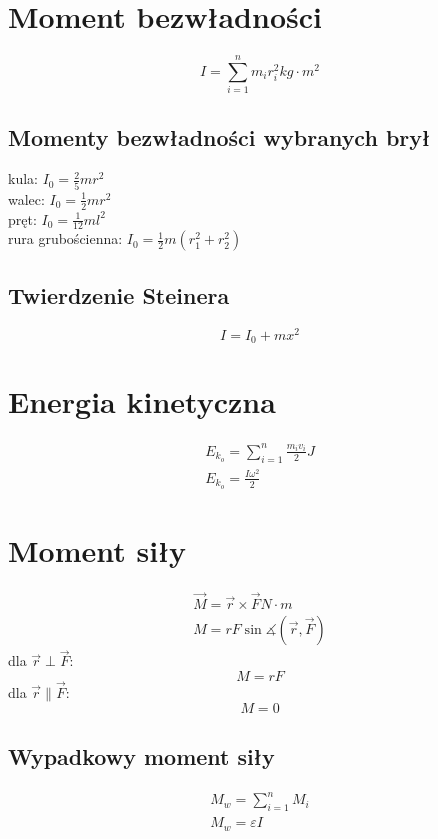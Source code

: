     \section{Moment bezwładności}
      \begin{equation}
        I = \sum_{i=1}^n m_ir_i^2 \unit{kg\cdot m^2}
      \end{equation}
        \subsection{Momenty bezwładności wybranych brył}
        kula: $I_0 = \frac{2}{5}mr^2$\\
        walec: $I_0 = \frac{1}{2}mr^2$\\
        pręt: $I_0 = \frac{1}{12}ml^2$\\
        rura grubościenna: $I_0 = \frac{1}{2}m(r_1^2 + r_2^2)$
      \subsection{Twierdzenie Steinera}
        \begin{equation}
          I = I_0 +mx^2
        \end{equation}
    \section{Energia kinetyczna}
      \begin{gather}
        E_{k_o} = \sum_{i=1}^n \frac{m_iv_i}{2} \unit{J}\\
        E_{k_o} = \frac{I\omega^2}{2}
      \end{gather}
    \section{Moment siły}
      \begin{gather}
        \vec M = \vec r\times\vec F \unit{N\cdot m}\\
        M = rF\sin\measuredangle(\vec r, \vec F)
      \end{gather}
      dla $\vec r \perp \vec F$:
      \begin{equation}
        M = rF
      \end{equation}
      dla $\vec r \parallel \vec F$:
      \begin{equation}
        M = 0
      \end{equation}
      \subsection{Wypadkowy moment siły}
        \begin{gather}
          M_w = \sum_{i=1}^n M_i\\
          M_w = \varepsilon I
        \end{gather}
